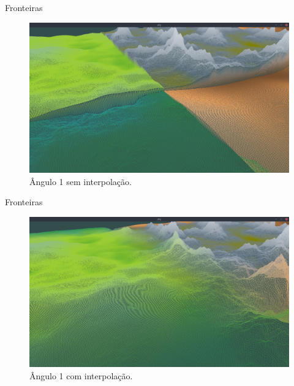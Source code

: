 \begin{frame}{Fronteiras}
    \begin{figure}[H]
        \centering
        \includegraphics[width=.9\textwidth]{img/border/a9/1s.png}
        \caption{Ângulo 1 sem interpolação.}
        \label{fig:img_border_a9_1s}
    \end{figure}
    
\end{frame}


\begin{frame}{Fronteiras}
    \begin{figure}[H]
        \centering
        \includegraphics[width=.9\textwidth]{img/border/a9/1c.png}
        \caption{Ângulo 1 com interpolação.}
        \label{fig:img_border_a9_1c}
    \end{figure}
    
\end{frame}

